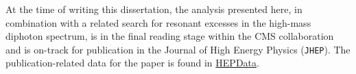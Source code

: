 At the time of writing this dissertation, the analysis presented here, in combination with a related search for resonant excesses in the high-mass diphoton spectrum, is in the final reading stage within the CMS collaboration and is on-track for publication in the Journal of High Energy Physics (\texttt{JHEP}). The publication-related data for the paper is found in \href{https://www.hepdata.net/record/sandbox/1709824707}{HEPData}.





